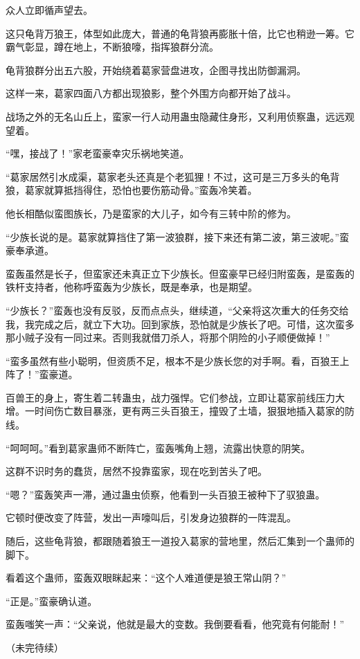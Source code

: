 \begin{this_body}
众人立即循声望去。

这只龟背万狼王，体型如此庞大，普通的龟背狼再膨胀十倍，比它也稍逊一筹。它霸气彰显，蹲在地上，不断狼嚎，指挥狼群分流。

龟背狼群分出五六股，开始绕着葛家营盘进攻，企图寻找出防御漏洞。

这样一来，葛家四面八方都出现狼影，整个外围方向都开始了战斗。

战场之外的无名山丘上，蛮家一行人动用蛊虫隐藏住身形，又利用侦察蛊，远远观望着。

“嘿，接战了！”家老蛮豪幸灾乐祸地笑道。

“葛家居然引水成渠，葛家老头还真是个老狐狸！不过，这可是三万多头的龟背狼，葛家就算抵挡得住，恐怕也要伤筋动骨。”蛮轰冷笑着。

他长相酷似蛮图族长，乃是蛮家的大儿子，如今有三转中阶的修为。

“少族长说的是。葛家就算挡住了第一波狼群，接下来还有第二波，第三波呢。”蛮豪奉承道。

蛮轰虽然是长子，但蛮家还未真正立下少族长。但蛮豪早已经归附蛮轰，是蛮轰的铁杆支持者，他称呼蛮轰为少族长，既是奉承，也是期望。

“少族长？”蛮轰也没有反驳，反而点点头，继续道，“父亲将这次重大的任务交给我，我完成之后，就立下大功。回到家族，恐怕就是少族长了吧。可惜，这次蛮多那小贼子没有一同过来。否则我就借刀杀人，将那个阴险的小子顺便做掉！”

“蛮多虽然有些小聪明，但资质不足，根本不是少族长您的对手啊。看，百狼王上阵了！”蛮豪道。

百兽王的身上，寄生着二转蛊虫，战力强悍。它们参战，立即让葛家前线压力大增。一时间伤亡数目暴涨，更有两三头百狼王，撞毁了土墙，狠狠地插入葛家的防线。

“呵呵呵。”看到葛家蛊师不断阵亡，蛮轰嘴角上翘，流露出快意的阴笑。

这群不识时务的蠢货，居然不投靠蛮家，现在吃到苦头了吧。

“嗯？”蛮轰笑声一滞，通过蛊虫侦察，他看到一头百狼王被种下了驭狼蛊。

它顿时便改变了阵营，发出一声嚎叫后，引发身边狼群的一阵混乱。

随后，这些龟背狼，都跟随着狼王一道投入葛家的营地里，然后汇集到一个蛊师的脚下。

看着这个蛊师，蛮轰双眼眯起来：“这个人难道便是狼王常山阴？”

“正是。”蛮豪确认道。

蛮轰嗤笑一声：“父亲说，他就是最大的变数。我倒要看看，他究竟有何能耐！”

（未完待续）

\end{this_body}


